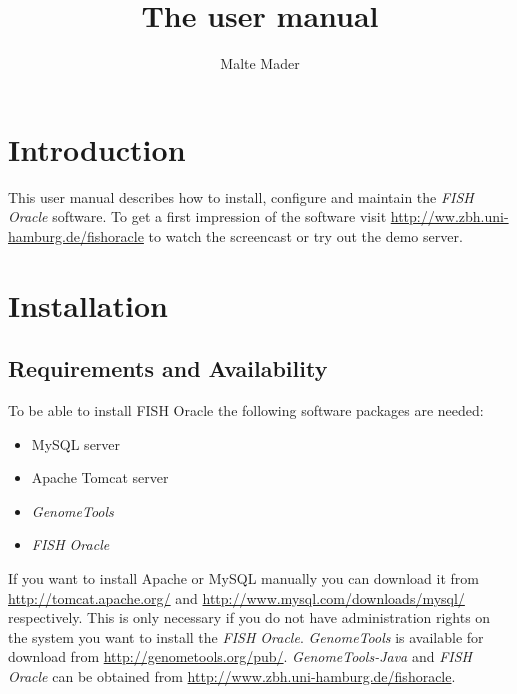 \documentclass[11pt,final]{article}
\title{The \FO user manual}
\author{Malte Mader}
\newcommand{\Gt}[0]{\emph{GenomeTools}\xspace}
\newcommand{\Gtj}[0]{\emph{GenomeTools-Java}\xspace}
\newcommand{\FO}[0]{\emph{FISH Oracle}\xspace}
\begin{document}
\maketitle
\tableofcontents

\section{Introduction}

This user manual describes how to install, configure and maintain the
\FO software. To get a first impression of the software visit 
\url{http://ww.zbh.uni-hamburg.de/fishoracle} to watch the screencast or
try out the demo server. 

\section{Installation}

\subsection{Requirements and Availability}

To be able to install FISH Oracle the following software packages are needed:

\begin{itemize}
  \item MySQL server
  \item Apache Tomcat server
  \item \Gt
  \item \FO
\end{itemize}

If you want to install Apache or MySQL manually you can download it from
\url{http://tomcat.apache.org/} and \url{http://www.mysql.com/downloads/mysql/}
respectively. This is only necessary if you do not have administration rights
on the system you want to install the \FO.
\Gt is available for download from \url{http://genometools.org/pub/}.
\Gtj and \FO can be obtained from \url{http://www.zbh.uni-hamburg.de/fishoracle}.
\end{document}
